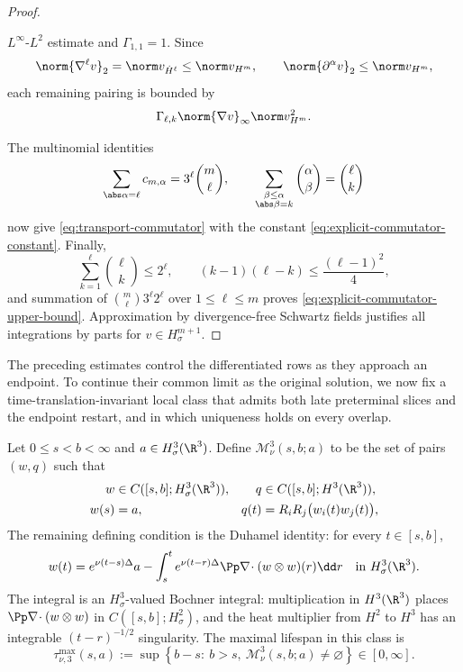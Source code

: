 \begin{proof}
\begin{samepage}
\(L^\infty\)-\(L^2\) estimate and \(\Gamma_{1,1}=1\).  Since
\[
 \norm{\nabla^\ell v}_2=\norm v_{\dot H^\ell}\le\norm v_{H^m},
 \qquad
 \norm{\partial^\alpha v}_2\le\norm v_{H^m},
\]
each remaining pairing is bounded by
\[
 \Gamma_{\ell,k}\norm{\nabla v}_\infty\norm v_{H^m}^2.
\]
\par
\end{samepage}
The multinomial identities
\[
 \sum_{\abs\alpha=\ell}c_{m,\alpha}
 =3^\ell\binom m\ell,
 \qquad
 \sum_{\substack{\beta\le\alpha\\\abs\beta=k}}
 \binom\alpha\beta=\binom\ell k
\]
now give \eqref{eq:transport-commutator} with the constant
\eqref{eq:explicit-commutator-constant}.  Finally,
\[
 \sum_{k=1}^{\ell}\binom\ell k\le2^\ell,
 \qquad
 (k-1)(\ell-k)\le\frac{(\ell-1)^2}{4},
\]
and summation of
\(
 \binom m\ell3^\ell2^\ell
\)
over \(1\le\ell\le m\) proves
\eqref{eq:explicit-commutator-upper-bound}.  Approximation by divergence-free
Schwartz fields justifies all integrations by parts for
\(v\in H^{m+1}_\sigma\).
\end{proof}

The preceding estimates control the differentiated rows as they approach an
endpoint.  To continue their common limit as the original solution, we now fix a
time-translation-invariant local class that admits both late preterminal
slices and the endpoint restart, and in which uniqueness holds on every
overlap.

\begin{definition}
\label{def:shifted-normalized-H3-mild-class}
Let \(0\le s<b<\infty\) and \(a\in H^3_\sigma(\R^3)\).  Define
\(\mathscr M_\nu^3(s,b;a)\) to be the set of pairs \((w,q)\) such that
\begin{align}
 w&\in C([s,b];H^3_\sigma(\R^3)),
 &q&\in C([s,b];H^3(\R^3)),
 \label{eq:shifted-mild-class-spaces}\\
 w(s)&=a,
 &q(t)&=R_iR_j\bigl(w_i(t)w_j(t)\bigr),
 \label{eq:shifted-mild-class-datum-pressure}
\end{align}
The remaining defining condition is the Duhamel identity: for every
\(t\in[s,b]\),
\begin{equation}
 w(t)=e^{\nu(t-s)\Delta}a
 -\int_s^t e^{\nu(t-r)\Delta}
 \Pp\nabla\!\cdot(w\otimes w)(r)\dd r
 \quad\text{in }H^3_\sigma(\R^3).
 \label{eq:shifted-mild-class-duhamel}
\end{equation}
The integral is an \(H^3_\sigma\)-valued Bochner integral: multiplication in
\(H^3(\R^3)\) places
\(\Pp\nabla\!\cdot(w\otimes w)\) in \(C([s,b];H^2_\sigma)\), and the heat
multiplier from \(H^2\) to \(H^3\) has an integrable
\((t-r)^{-1/2}\) singularity.
The maximal lifespan in this class is
\begin{equation}
 \tau_{\nu,3}^{\max}(s,a)
 :=\sup\left\{b-s:\ b>s,\
 \mathscr M_\nu^3(s,b;a)\ne\varnothing\right\}\in[0,\infty].
 \label{eq:shifted-mild-maximal-lifespan}
\end{equation}
\end{definition}

